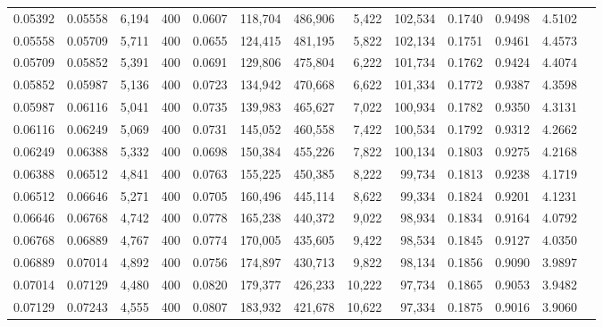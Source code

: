 \begin{tabular}{rrrrrrrrrrrrr}
0.05392 & 0.05558 &  6,194 & 400 &                                     0.0607 & 118,704 & 486,906 &   5,422 & 102,534 & 0.1740 & 0.9498 & 4.5102 \\
0.05558 & 0.05709 &  5,711 & 400 &                                     0.0655 & 124,415 & 481,195 &   5,822 & 102,134 & 0.1751 & 0.9461 & 4.4573 \\
0.05709 & 0.05852 &  5,391 & 400 &                                     0.0691 & 129,806 & 475,804 &   6,222 & 101,734 & 0.1762 & 0.9424 & 4.4074 \\
0.05852 & 0.05987 &  5,136 & 400 &                                     0.0723 & 134,942 & 470,668 &   6,622 & 101,334 & 0.1772 & 0.9387 & 4.3598 \\
0.05987 & 0.06116 &  5,041 & 400 &                                     0.0735 & 139,983 & 465,627 &   7,022 & 100,934 & 0.1782 & 0.9350 & 4.3131 \\
0.06116 & 0.06249 &  5,069 & 400 &                                     0.0731 & 145,052 & 460,558 &   7,422 & 100,534 & 0.1792 & 0.9312 & 4.2662 \\
0.06249 & 0.06388 &  5,332 & 400 &                                     0.0698 & 150,384 & 455,226 &   7,822 & 100,134 & 0.1803 & 0.9275 & 4.2168 \\
0.06388 & 0.06512 &  4,841 & 400 &                                     0.0763 & 155,225 & 450,385 &   8,222 &  99,734 & 0.1813 & 0.9238 & 4.1719 \\
0.06512 & 0.06646 &  5,271 & 400 &                                     0.0705 & 160,496 & 445,114 &   8,622 &  99,334 & 0.1824 & 0.9201 & 4.1231 \\
0.06646 & 0.06768 &  4,742 & 400 &                                     0.0778 & 165,238 & 440,372 &   9,022 &  98,934 & 0.1834 & 0.9164 & 4.0792 \\
0.06768 & 0.06889 &  4,767 & 400 &                                     0.0774 & 170,005 & 435,605 &   9,422 &  98,534 & 0.1845 & 0.9127 & 4.0350 \\
0.06889 & 0.07014 &  4,892 & 400 &                                     0.0756 & 174,897 & 430,713 &   9,822 &  98,134 & 0.1856 & 0.9090 & 3.9897 \\
0.07014 & 0.07129 &  4,480 & 400 &                                     0.0820 & 179,377 & 426,233 &  10,222 &  97,734 & 0.1865 & 0.9053 & 3.9482 \\
0.07129 & 0.07243 &  4,555 & 400 &                                     0.0807 & 183,932 & 421,678 &  10,622 &  97,334 & 0.1875 & 0.9016 & 3.9060 \\

\end{tabular}
